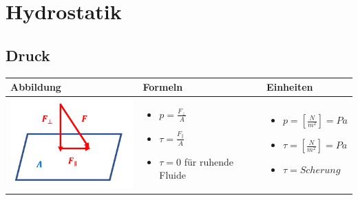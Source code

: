 \section{Hydrostatik}
	
	\subsection{Druck}										%
	\begin{table}[h!]

	\begin{tabular}{ | m{6cm} | m{6cm} | m{6cm} | }
	\hline
	Abbildung & Formeln & Einheiten \\ \hline
	\midrule
	\begin{minipage}{.1\textwidth}
	\includegraphics[width=5cm]{Figures/Druck.png}
	\end{minipage}
	&
	\begin{itemize}
	\item $p=\frac{F_{\perp}}{A}$
	\item $\tau=\frac{F_{\parallel}}{A}$
	\item {\color{red}$\tau = 0 $ für ruhende Fluide} 
	\end{itemize}
	& 
	\begin{itemize}
	\item $p=[\frac{N}{m^2}]=Pa$
	\item $\tau=[\frac{N}{m^2}]=Pa$
	\item $\tau=Scherung$ 
	\end{itemize}
	\\ \hline
	\end{tabular}
	\end{table}

